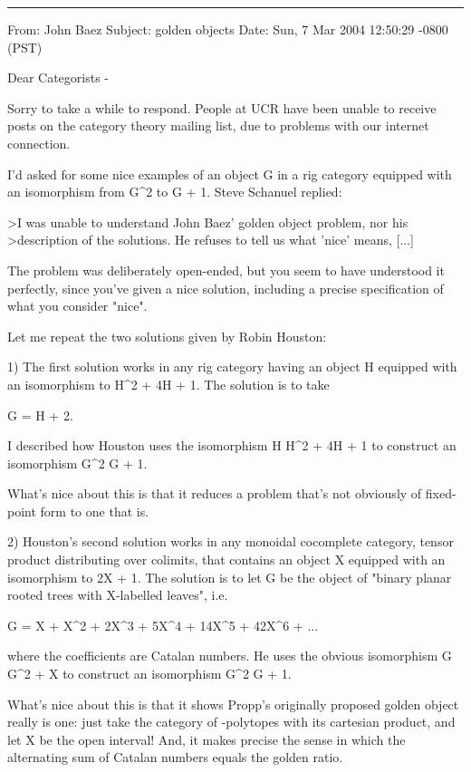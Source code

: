 \par\noindent\rule{\textwidth}{0.4pt}


From: John Baez
Subject: golden objects
Date: Sun, 7 Mar 2004 12:50:29 -0800 (PST)

Dear Categorists -

Sorry to take a while to respond.  People at UCR have been unable to
receive posts on the category theory mailing list, due to problems with
our internet connection.  

I'd asked for some nice examples of an object G in a rig category
equipped with an isomorphism from G^2 to G + 1.  Steve Schanuel replied:

>I was unable to understand John Baez' golden object problem, nor his
>description of the solutions.  He refuses to tell us what 'nice' means, [...]

The problem was deliberately open-ended, but you seem to have 
understood it perfectly, since you've given a nice solution, 
including a precise specification of what you consider "nice".  

Let me repeat the two solutions given by Robin Houston:

1) The first solution works in any rig category having an object H 
equipped with an isomorphism to H^2 + 4H + 1.  The solution is to take

G = H + 2.

I described how Houston uses the isomorphism H \to  H^2 + 4H + 1 to 
construct an isomorphism G^2 \to  G + 1.  

What's nice about this is that it reduces a problem that's not 
obviously of fixed-point form to one that is.

2) Houston's second solution works in any monoidal cocomplete category, 
tensor product distributing over colimits, that contains an object X 
equipped with an isomorphism to 2X + 1.  The solution is to let G be 
the object of "binary planar rooted trees with X-labelled leaves", i.e.

G = X + X^2 + 2X^3 + 5X^4 + 14X^5 + 42X^6 + ...

where the coefficients are Catalan numbers.  He uses the obvious 
isomorphism G \to  G^2 + X to construct an isomorphism G^2 \to  G + 1.

What's nice about this is that it shows Propp's originally proposed
golden object really is one: just take the category of \sigma -polytopes 
with its cartesian product, and let X be the open interval!  And,
it makes precise the sense in which the alternating sum of Catalan
numbers equals the golden ratio.

